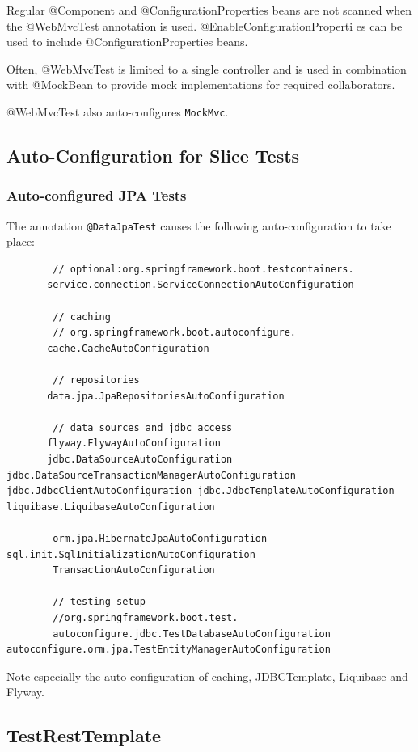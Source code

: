 \documentclass{scrartcl}
\begin{document}
Regular @Component and @ConfigurationProperties beans are not scanned when the @WebMvcTest annotation is used. @EnableConfigurationProperti es can be used to include @ConfigurationProperties beans.

Often, @WebMvcTest is limited to a single controller and is used in combination with @MockBean to provide mock implementations for required collaborators.

@WebMvcTest also auto-configures \lstinline|MockMvc|.


\subsection{Auto-Configuration for Slice Tests}
\subsubsection{Auto-configured JPA Tests}

The annotation \lstinline|@DataJpaTest| causes the following auto-configuration to take place:

\begin{lstlisting}
        // optional:org.springframework.boot.testcontainers.
       service.connection.ServiceConnectionAutoConfiguration

        // caching
        // org.springframework.boot.autoconfigure.
       cache.CacheAutoConfiguration

        // repositories
       data.jpa.JpaRepositoriesAutoConfiguration

        // data sources and jdbc access
       flyway.FlywayAutoConfiguration
       jdbc.DataSourceAutoConfiguration jdbc.DataSourceTransactionManagerAutoConfiguration jdbc.JdbcClientAutoConfiguration jdbc.JdbcTemplateAutoConfiguration liquibase.LiquibaseAutoConfiguration

        orm.jpa.HibernateJpaAutoConfiguration sql.init.SqlInitializationAutoConfiguration
        TransactionAutoConfiguration

        // testing setup
        //org.springframework.boot.test.
        autoconfigure.jdbc.TestDatabaseAutoConfiguration autoconfigure.orm.jpa.TestEntityManagerAutoConfiguration

\end{lstlisting}

Note especially the auto-configuration of caching, JDBCTemplate, Liquibase and Flyway.

\subsection{TestRestTemplate}
\end{document}
